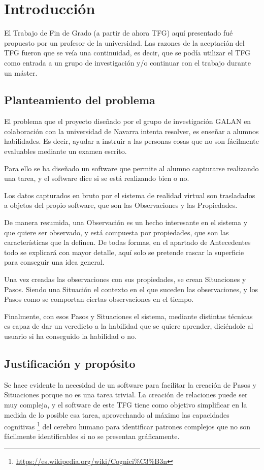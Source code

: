 \chapter{Introducci\'{o}n} 
El Trabajo de Fin de Grado (a partir de ahora TFG) aqu\'{i} presentado fu\'{e} propuesto por un profesor de la universidad.
Las razones de la aceptaci\'{o}n del TFG fueron que se ve\'{i}a una continuidad, es decir, que se pod\'{i}a 
utilizar el TFG como entrada a un grupo de investigaci\'{o}n y/o continuar con el trabajo durante un m\'{a}ster.

\section{Planteamiento del problema}
El problema que el proyecto dise\~nado por el grupo de investigaci\'on GALAN en colaboraci\'on
con la universidad de Navarra intenta resolver, es ense\~nar a alumnos habilidades. Es decir, ayudar a 
instruir a las personas cosas que no son f\'acilmente evaluables mediante un examen escrito.

Para ello se ha dise\~nado un software que permite al alumno capturarse realizando una tarea, y el
software dice si se est\'a realizando bien o no.

Los datos capturados en bruto por el sistema de realidad virtual son trasladados a objetos del propio software,
que son las Observaciones y las Propiedades.

De manera resumida, una Observaci\'on es un hecho interesante en el sistema y que quiere ser observado, y 
est\'a compuesta por propiedades, que son las caracter\'isticas que la definen. De todas formas, en el 
apartado de Antecedentes todo se explicar\'a con mayor detalle, aqu\'i solo se pretende rascar la superficie para 
conseguir una idea general.

Una vez creadas las observaciones con sus propiedades, se crean Situaciones y Pasos. Siendo una Situaci\'on el contexto
en el que suceden las observaciones, y los Pasos como se comportan ciertas observaciones en el tiempo.

Finalmente, con esos Pasos y Situaciones el sistema, mediante distintas t\'ecnicas es capaz de dar un veredicto
a la habilidad que se quiere aprender, dici\'endole al usuario si ha conseguido la habilidad o no.

\section{Justificaci\'{o}n y prop\'osito}
Se hace evidente la necesidad de un software para facilitar la creaci\'on de Pasos y Situaciones porque
no es una tarea trivial. La creaci\'on de relaciones puede ser muy compleja, y el software de este TFG
tiene como objetivo simplificar en la medida de lo posible esa tarea, aprovechando al m\'aximo las capacidades
cognitivas \footnote{\url{https://es.wikipedia.org/wiki/Cognici\%C3\%B3n}} del cerebro humano para identificar
patrones complejos que no son f\'acilmente identificables si no se presentan gr\'aficamente.

